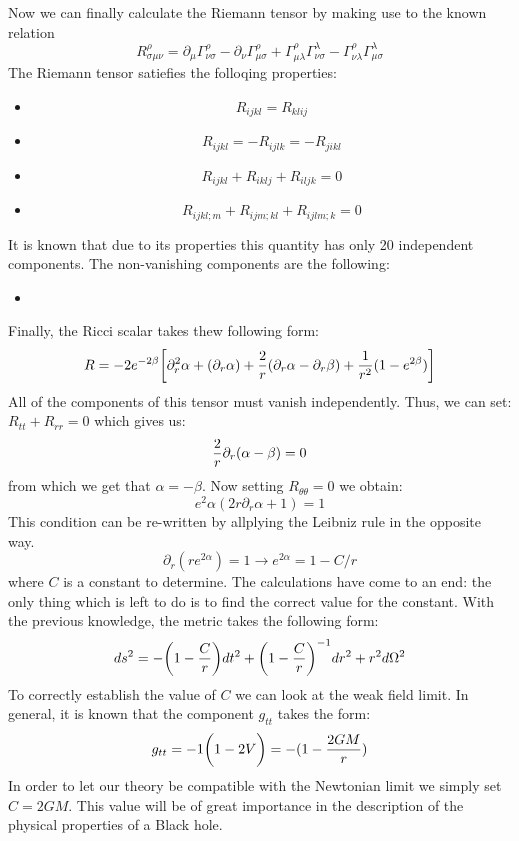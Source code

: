 \documentclass[]{article}
\theoremstyle{definition}
\theoremstyle{Theorem}
\theoremstyle{definition}
\theoremstyle{definition}
\theoremstyle{definition}
\begin{document}
Now we can finally calculate the Riemann tensor by making use to the known relation 
$$R^\rho_{\sigma\mu\nu}=\partial_\mu\Gamma^\rho_{\nu\sigma}-\partial_\nu\Gamma^\rho_{\mu\sigma}+\Gamma^\rho_{\mu\lambda}\Gamma^\lambda_{\nu\sigma}-\Gamma^\rho_{\nu\lambda}\Gamma^\lambda_{\mu\sigma}$$ 
The Riemann tensor satiefies the folloqing properties:
\begin{itemize}
	\item $$R_{ijkl}=R_{klij}$$
	\item $$R_{ijkl}=-R_{ijlk}=-R_{jikl}$$
	\item $$R_{ijkl}+R_{iklj}+R_{iljk}=0$$
	\item $$R_{ijkl;m}+R_{ijm;kl}+R_{ijlm;k}=0$$
\end{itemize}
It is known that due to its properties this quantity has only 20 independent components. The non-vanishing components are the following:
\begin{itemize}
	\item 
\end{itemize}
Finally, the Ricci scalar takes thew following form:
$$R=-2e^{-2\beta}\bigg[\partial_r^2\alpha+(\partial_r\alpha)+{2\over r}(\partial_r\alpha-\partial_r\beta)+{1\over r^2}(1-e^{2\beta})\bigg]$$
All of the components of this tensor must vanish independently. Thus, we can set: $R_{tt}+R_{rr}=0$ which gives us:
$${2\over r}\partial_r (\alpha-\beta)=0$$ 
from which we get that $\alpha=-\beta$. Now setting $R_{\theta\theta}=0$ we obtain:
$$e^2\alpha(2r\partial_r\alpha+1)=1$$
This condition can be re-written by allplying the Leibniz rule in the opposite way.
$$\partial_r(re^{2\alpha})=1\longrightarrow e^{2\alpha}=1-{C/r}$$
where $C$ is a constant to determine. The calculations have come to an end: the only thing which is left to do is to find the correct value for the constant. With the previous knowledge, the metric takes the following form:
$$ds^2=-\bigg(1-{C\over r}\bigg)dt^2+\bigg(1-{C\over r}\bigg)^{-1}dr^2+r^2d\Omega^2$$
To correctly establish the value of $C$ we can look at the weak field limit. In general, it is known that the component $g_{tt}$ takes the form:
$$g_{tt}=-1\bigg(1-2V\bigg)=-(1-{2GM\over r})$$
In order to let our theory be compatible with the Newtonian limit we simply set $C=2GM$. This value will be of great importance in the description of the physical properties of a Black hole.
\end{document}
